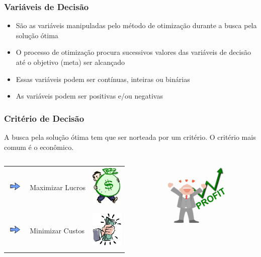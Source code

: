 \documentclass{beamer}
\begin{document}
\begin{frame}
	\frametitle{Variáveis de Decisão}
	\begin{itemize}
	\item São as variáveis manipuladas pelo método de otimização durante a busca pela solução ótima
	\item O processo de otimização procura sucessivos valores das variáveis de decisão até o objetivo (meta) ser alcançado
	\item Essas variáveis podem ser contínuas, inteiras ou binárias
	\item As variáveis podem ser positivas e/ou negativas
	\end{itemize}
\end{frame}

\begin{frame}
	\frametitle{Critério de Decisão}
	A busca pela solução ótima tem que ser norteada por um \alert{critério}. O critério mais comum é o \alert{econômico}.
	\begin{columns}
		\begin{column}{0.7\textwidth}
			\begin{table}
				\centering
				\begin{tabular}{m{1cm}m{3cm}m{2cm}}
					\includegraphics[width=0.8cm,height=0.4cm]{seta.jpg} & Maximizar Lucros & \includegraphics[width=1.5cm,height=2cm]{dinheiro2.jpg} \\
					\includegraphics[width=0.8cm,height=0.4cm]{seta.jpg} & Minimizar Custos & \includegraphics[width=1.5cm,height=2cm]{dinheiro.jpg} \\
				\end{tabular}
			\end{table}
		\end{column}	

		\begin{column}{0.3\textwidth}
			\includegraphics[width=3cm,height=3cm]{profit.png}
		\end{column}
	\end{columns}
\end{frame}
\end{document}

